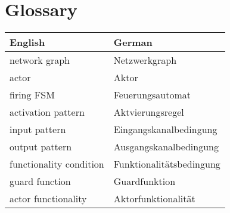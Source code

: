 \chapter{Glossary}

\begin{tabular}[t]{|l|l|}
\hline
  English                     & German                    \\
\hline\hline
  network graph               & Netzwerkgraph             \\\hline
  actor                       & Aktor                     \\\hline
  firing FSM                  & Feuerungsautomat          \\\hline
  activation pattern          & Aktvierungsregel          \\\hline
  input pattern               & Eingangskanalbedingung    \\\hline
  output pattern              & Ausgangskanalbedingung    \\\hline
  functionality condition     & Funktionalitätsbedingung  \\\hline
  guard function              & Guardfunktion             \\\hline
  actor functionality         & Aktorfunktionalität       \\\hline
\end{tabular}
